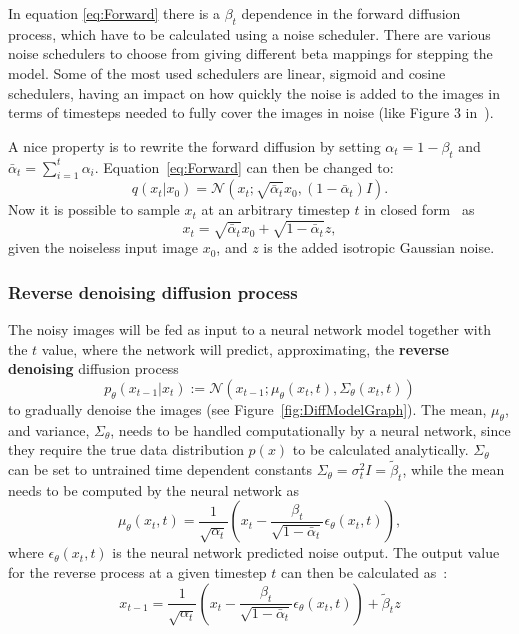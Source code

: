 \documentclass[fullpaper]{nldl}
\begin{document}
In equation \ref{eq:Forward} there is a $\beta_t$ dependence in the forward diffusion process, which have to be calculated using a noise scheduler. There are various noise schedulers to choose from giving different beta mappings for stepping the model. Some of the most used schedulers are linear, sigmoid and cosine schedulers, having an impact on how quickly the noise is added to the images in terms of timesteps needed to fully cover the images in noise (like Figure 3 in~\cite{chen2023importance}).

A nice property is to rewrite the forward diffusion by setting $\alpha_t = 1 - \beta_t$ and $\bar{\alpha}_t = \sum_{i=1}^{t}\alpha_i$. Equation~\ref{eq:Forward} can then be changed to:
\begin{equation}
	\label{eq:Forward_alphas}
	q(x_t|x_0) = \mathcal{N}(x_{t}; \sqrt{\bar{\alpha}_t}x_0, (1-\bar{\alpha}_t)I).
\end{equation}
Now it is possible to sample $x_t$ at an arbitrary timestep $t$ in closed form~\cite{Schmitt2019} as
\begin{equation}
	\label{eq:sample_xt}
	x_t = \sqrt{\bar{\alpha}_t}x_0 + \sqrt{1 - \bar{\alpha}_t}z,
\end{equation}
given the noiseless input image $x_0$, and $z$ is the added isotropic Gaussian noise.


\subsubsection{Reverse denoising diffusion process}
\label{subsubsect:ReverseDenoise}
The noisy images will be fed as input to a neural network model together with the $t$ value, where the network will predict, approximating, the \textbf{reverse denoising} diffusion process 
\begin{equation}
	\label{eq:Reverse}
	p_{\theta}(x_{t-1}|x_t) := \mathcal{N}(x_{t-1}; \mu_{\theta}(x_t, t), \Sigma_{\theta}(x_t,t))
\end{equation}
to gradually denoise the images (see Figure~\ref{fig:DiffModelGraph}). The mean, $\mu_{\theta}$, and variance, $\Sigma_{\theta}$, needs to be handled computationally by a neural network, since they require the true data distribution $p(x)$ to be calculated analytically. $\Sigma_{\theta}$ can be set to untrained time dependent constants  $\Sigma_{\theta}=\sigma_t^2I=\tilde{\beta}_t$, while the mean needs to be computed by the neural network as
\begin{equation}
	\label{eq:Mean}
	\mu_{\theta}(x_t,t)=\frac{1}{\sqrt{\alpha_t}}(x_t - \frac{\beta_t}{\sqrt{1 - \bar{\alpha}_t}}\epsilon_{\theta}(x_t,t)),
\end{equation}
where $\epsilon_{\theta}(x_t,t)$ is the neural network predicted noise output. The output value for the reverse process at a given timestep $t$ can then be calculated as~\cite{Schmitt2019}:
\begin{equation}
	\label{eq:}
	x_{t-1} = \frac{1}{\sqrt{\alpha_t}}(x_t - \frac{\beta_t}{\sqrt{1 - \bar{\alpha}_t}}\epsilon_{\theta}(x_t,t)) + \tilde{\beta}_tz
\end{equation}
\end{document}
